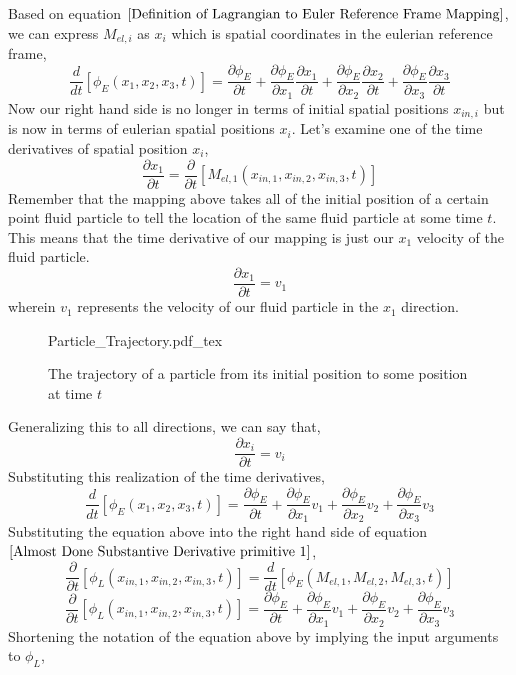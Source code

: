 Based on equation $\ref{Definition of Lagrangian to Euler Reference Frame Mapping}$, we can express $M_{el,i}$ as $x_{i}$ which is spatial coordinates in the eulerian reference frame,
$$\frac{d}{d t}\left[\phi_{E}(x_{1}, x_{2}, x_{3}, t)\right] = \frac{\partial \phi_{E}}{\partial t} + \frac{\partial \phi_{E}}{\partial x_{1}}\frac{\partial x_{1}}{\partial t} + \frac{\partial \phi_{E}}{\partial x_{2}}\frac{\partial x_{2}}{\partial t} + \frac{\partial \phi_{E}}{\partial x_{3}}\frac{\partial x_{3}}{\partial t}$$
Now our right hand side is no longer in terms of initial spatial positions $x_{in,i}$ but is now in terms of eulerian spatial positions $x_{i}$.
Let's examine one of the time derivatives of spatial position $x_{i}$,
$$\frac{\partial x_{1}}{\partial t} = \frac{\partial }{\partial t}\left[M_{el,1}(x_{in,1}, x_{in,2}, x_{in,3}, t)\right]$$
Remember that the mapping above takes all of the initial position of a certain point fluid particle to tell the location of the same fluid particle at some time $t$. 
This means that the time derivative of our mapping is just our $x_{1}$ velocity of the fluid particle.
$$\frac{\partial x_{1}}{\partial t} = v_{1}$$
wherein $v_{1}$ represents the velocity of our fluid particle in the $x_{1}$ direction.
\begin{figure}[H]\centering
\def\svgwidth{400px}
{Particle_Trajectory.pdf_tex}
\caption{The trajectory of a particle from its initial position to some position at time $t$}
\label{particle trajectory substantive derivative}
\end{figure}
Generalizing this to all directions, we can say that,
$$\frac{\partial x_{i}}{\partial t} = v_{i}$$
Substituting this realization of the time derivatives,
$$\frac{d}{d t}\left[\phi_{E}(x_{1}, x_{2}, x_{3}, t)\right] = \frac{\partial \phi_{E}}{\partial t} + \frac{\partial \phi_{E}}{\partial x_{1}}v_{1} + \frac{\partial \phi_{E}}{\partial x_{2}}v_{2} + \frac{\partial \phi_{E}}{\partial x_{3}}v_{3}$$
Substituting the equation above into the right hand side of equation $\ref{Almost Done Substantive Derivative primitive 1}$,
$$\frac{\partial}{\partial t}\left[\phi_{L}(x_{in,1},x_{in,2},x_{in,3},t)\right] = \frac{d}{d t}\left[\phi_{E}(M_{el,1}, M_{el,2}, M_{el,3}, t)\right]$$
$$\frac{\partial}{\partial t}\left[\phi_{L}(x_{in,1},x_{in,2},x_{in,3},t)\right] = \frac{\partial \phi_{E}}{\partial t} + \frac{\partial \phi_{E}}{\partial x_{1}}v_{1} + \frac{\partial \phi_{E}}{\partial x_{2}}v_{2} + \frac{\partial \phi_{E}}{\partial x_{3}}v_{3}$$
Shortening the notation of the equation above by implying the input arguments to $\phi_{L}$,

